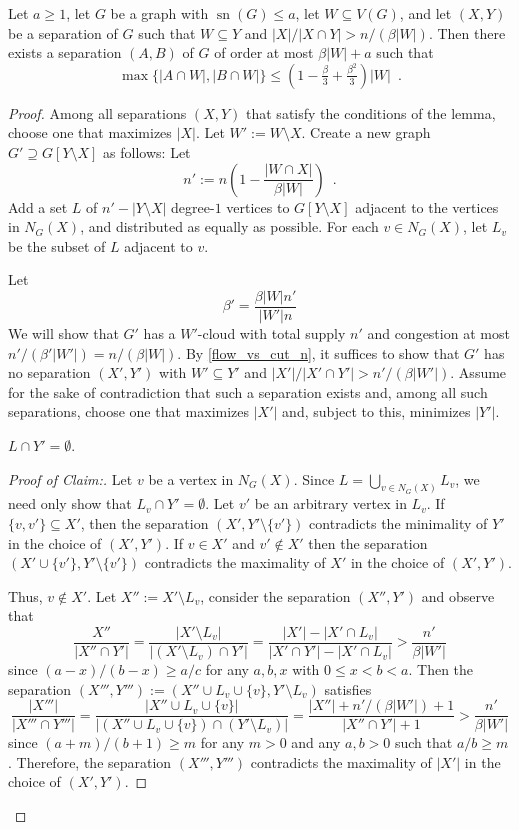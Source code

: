 \documentclass{patmorin}
\newenvironment{clmproof}{\begin{proof}[Proof of Claim:]\renewcommand{\qedsymbol}{\rule{1ex}{1ex}}}{\end{proof}}
\DeclareMathOperator{\sep}{sn}
\begin{document}
\begin{lem}
  Let $a\ge 1$, let $G$ be a graph with $\sep(G)\le a$, let $W\subseteq V(G)$, and let $(X,Y)$ be a separation of $G$ such that $W\subseteq Y$ and $|X|/|X\cap Y| > n/(\beta|W|)$.  Then there exists a separation $(A,B)$ of $G$ of order at most $\beta|W|+a$ such that
  \[
  \max\{|A\cap W|,|B\cap W|\}\le \left(1-\tfrac{\beta}{3}+\tfrac{\beta^2}{3}\right)|W| \enspace .
  \]
\end{lem}

\begin{proof}
  Among all separations $(X,Y)$ that satisfy the conditions of the lemma, choose one that maximizes $|X|$.    Let $W':=W\setminus X$.
  Create a new graph $G'\supseteq G[Y\setminus X]$ as follows:  Let
  \[
    n':=n\left(1-\frac{|W\cap X|}{\beta|W|}\right) \enspace .
  \]
  Add a set $L$ of $n'-|Y\setminus X|$ degree-$1$ vertices to $G[Y\setminus X]$ adjacent to the vertices in $N_G(X)$, and distributed as equally as possible.  For each $v\in N_G(X)$, let $L_v$ be the subset of $L$ adjacent to $v$.

  Let
  \[
    \beta' = \frac{\beta|W|n'}{|W'|n}
  \]
  We will show that $G'$ has a $W'$-cloud with total supply $n'$ and congestion at most $n'/(\beta'|W'|)=n/(\beta|W|)$.  By \cref{flow_vs_cut_n}, it suffices to show that $G'$ has no separation $(X',Y')$ with $W'\subseteq Y'$ and $|X'|/|X'\cap Y'|>n'/(\beta|W'|)$.  Assume for the sake of contradiction that such a separation exists and, among all such separations, choose one that maximizes $|X'|$ and, subject to this, minimizes $|Y'|$.

  \begin{clm}\label{no_l_in_y}
    $L\cap Y'=\emptyset$.
  \end{clm}

  \begin{clmproof}
    Let $v$ be a vertex in $N_G(X)$. Since $L=\bigcup_{v\in N_G(X)}L_v$, we need only show that $L_v\cap Y'=\emptyset$.
    Let $v'$ be an arbitrary vertex in $L_v$.  If $\{v,v'\}\subseteq X'$, then the separation $(X',Y'\setminus\{v'\})$ contradicts the minimality of $Y'$ in the choice of $(X',Y')$.  If $v\in X'$ and $v'\not\in X'$ then the separation $(X'\cup\{v'\},Y'\setminus\{v'\})$ contradicts the maximality of $X'$ in the choice of $(X',Y')$.

    Thus, $v\not\in X'$.  Let $X'':=X'\setminus L_v$, consider the separation $(X'',Y')$ and observe that
    \[
      \frac{X''}{|X''\cap Y'|}=\frac{|X'\setminus L_v|}{|(X'\setminus L_v)\cap Y'|}
     = \frac{|X'|-|X'\cap L_v|}{|X'\cap Y'|-|X'\cap L_v|} > \frac{n'}{\beta|W'|}
    \]
    since $(a-x)/(b-x) \ge a/c$ for any $a,b,x$ with $0\le x<b<a$.  Then the separation $(X''',Y'''):=(X''\cup L_v\cup \{v\},Y'\setminus L_v)$ satisfies
    \[
      \frac{|X'''|}{|X'''\cap Y'''|} =
      \frac{|X''\cup L_v\cup \{v\}|}{|(X''\cup L_v\cup\{v\})\cap (Y'\setminus L_v)|} = \frac{|X''|+n'/(\beta|W'|)+1}{|X''\cap Y'|+1} > \frac{n'}{\beta|W'|}
    \]
    since $(a+m)/(b+1)\ge m$ for any $m>0$ and any $a,b>0$ such that $a/b\ge m$.  Therefore, the separation $(X''',Y''')$ contradicts the maximality of $|X'|$ in the choice of $(X',Y')$.
  \end{clmproof}


\end{proof}
\end{document}
